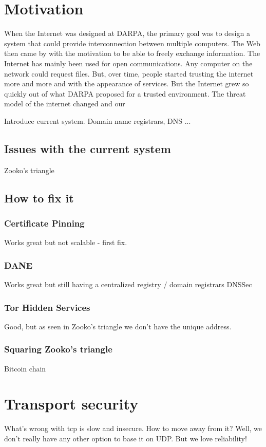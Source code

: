 \documentclass{vldb}
\begin{document}
\section{Motivation}
When the Internet was designed at DARPA, the primary goal was to design a system that could provide interconnection between multiple computers. The Web then came by with the motivation to be able to freely exchange information. The Internet has mainly been used for open communications. Any computer on the network could request files. But, over time, people started trusting the internet more and more and with the appearance of services. But the Internet grew so quickly out of what DARPA proposed for a trusted environment. The threat model of the internet changed and our 


Introduce current system. Domain name registrars, DNS ...

\subsection{ Issues with the current system} 
Zooko's triangle
\subsection{How to fix it}
\subsubsection{Certificate Pinning}
Works great but not scalable - first fix.
\subsubsection{DANE}
Works great but still having a centralized registry / domain registrars
DNSSec
\subsubsection{Tor Hidden Services}
Good, but as seen in Zooko's triangle we don't have the unique address.
\subsubsection{Squaring Zooko's triangle}
Bitcoin chain

\section{Transport security}
What's wrong with tcp is slow and insecure. How to move away from it? Well, we don't really have any other option to base it on UDP.
But we love reliability!
\end{document}
